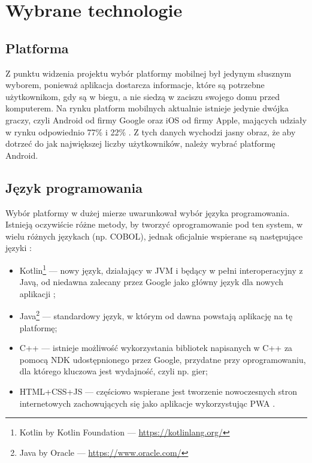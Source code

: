 \documentclass[polish,polish,a4paper,12pt]{article}
\let\sectioncmd\section
\renewcommand{\section}{\clearpage\sectioncmd}
\begin{document}
\section{Wybrane technologie}\label{technology}
	\subsection{Platforma}

	Z punktu widzenia projektu wybór platformy mobilnej był jedynym słusznym wyborem, ponieważ aplikacja dostarcza informacje, które są potrzebne użytkownikom, gdy są w biegu, a nie siedzą w zaciszu swojego domu przed komputerem. Na rynku platform mobilnych aktualnie istnieje jedynie dwójka graczy, czyli Android od firmy Google oraz iOS od firmy Apple, mających udziały w rynku odpowiednio 77\% i 22\% \cite{mobilemarketshare}. Z tych danych wychodzi jasny obraz, że aby dotrzeć do jak największej liczby użytkowników, należy wybrać platformę Android.

	\subsection{Język programowania}

	Wybór platformy w dużej mierze uwarunkował wybór języka programowania. Istnieją oczywiście różne metody, by tworzyć oprogramowanie pod ten system, w wielu różnych językach (np. COBOL), jednak oficjalnie wspierane są następujące języki \cite{androiddevelopment}:

	\begin{itemize}
		\item Kotlin\footnote{Kotlin by Kotlin Foundation — \url{https://kotlinlang.org/}} — nowy język, działający w JVM i będący w pełni interoperacyjny z Javą, od niedawna zalecany przez Google jako główny język dla nowych aplikacji \cite{kotlinfirst};
		\item Java\footnote{Java by Oracle — \url{https://www.oracle.com/}} — standardowy język, w którym od dawna powstają aplikację na tę platformę;
		\item C++ — istnieje możliwość wykorzystania bibliotek napisanych w C++ za pomocą NDK \cite{ndk} udostępnionego przez Google, przydatne przy oprogramowaniu, dla którego kluczowa jest wydajność, czyli np. gier;
		\item HTML+CSS+JS — częściowo wspierane jest tworzenie nowoczesnych stron internetowych zachowujących się jako aplikacje wykorzystując PWA \cite{pwa}.
	\end{itemize}
\end{document}
